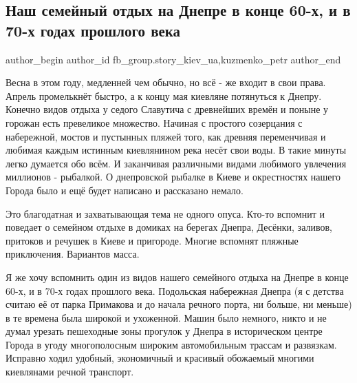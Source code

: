  
 
 
 
 
 
\subsection{Наш семейный отдых на Днепре в конце 60-х, и в 70-х годах прошлого века}
\label{sec:30_03_2021.fb.fb_group.story_kiev_ua.1.dnepr_semja_otdyh}
 
\ifcmt
 author_begin
   author_id fb_group.story_kiev_ua,kuzmenko_petr
 author_end
\fi

Весна в этом году, медленней чем обычно, но всё - же входит в свои права.
Апрель промелькнёт быстро, а к концу мая киевляне потянуться к Днепру. Конечно
видов отдыха у седого Славутича с древнейших времён и поныне у горожан есть
превеликое множество. Начиная с простого созерцания с набережной, мостов и
пустынных пляжей того, как древняя переменчивая и любимая каждым истинным
киевлянином река несёт свои воды. В такие минуты легко думается обо всём. И
заканчивая различными видами любимого увлечения миллионов - рыбалкой. О
днепровской рыбалке в Киеве и окрестностях нашего Города было и ещё будет
написано и рассказано немало. 

Это благодатная и захватывающая тема не одного опуса. Кто-то вспомнит и
поведает о семейном отдыхе в домиках на берегах Днепра, Десёнки, заливов,
притоков и речушек в Киеве и пригороде. Многие вспомнят пляжные приключения.
Вариантов масса. 

\begin{multicols}{2} %
\setlength{\parindent}{0pt}
\end{multicols} %

Я же хочу вспомнить один из видов нашего семейного отдыха на Днепре в конце
60-х, и в 70-х годах прошлого века. Подольская набережная Днепра (я с детства
считаю её от парка Примакова и до начала речного порта, ни больше, ни меньше) в
те времена была широкой и ухоженной. Машин было немного, никто и не думал
урезать пешеходные зоны прогулок у Днепра в историческом центре Города в угоду
многополосным широким автомобильным трассам и развязкам. Исправно ходил
удобный, экономичный и красивый обожаемый многими киевлянами речной транспорт. 

